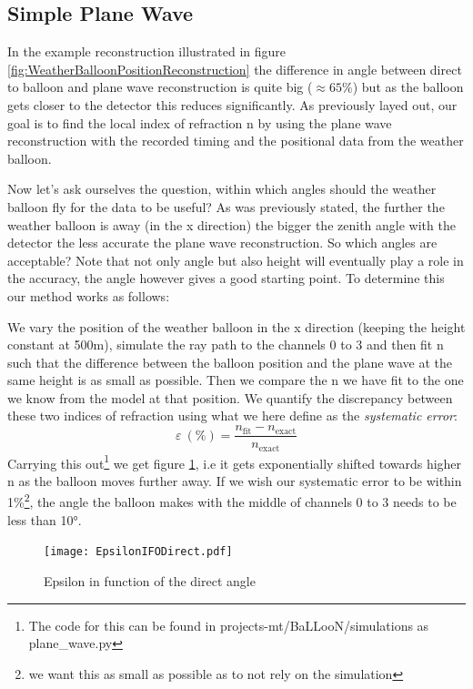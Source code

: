 \subsection{Simple Plane Wave}
In the example reconstruction illustrated in figure
\ref{fig:WeatherBalloonPositionReconstruction} the difference in angle between
direct to balloon and plane wave reconstruction is quite big
($\approx 65\%$) but as the balloon gets closer to the detector this reduces
significantly. As previously layed out, our goal is to find the local index of refraction n by using the
plane wave reconstruction with the recorded timing and the positional data from
the weather balloon.

Now let's ask ourselves the question, within which angles should the
weather balloon fly for the data to be useful?  As was previously stated, the
further the weather balloon is away (in the x direction) the bigger the zenith
angle with the detector the less accurate the plane wave reconstruction.  So
which angles are acceptable? Note that not only angle but also height will eventually
play a role in the accuracy, the angle however gives a good starting point.
To determine this our method works as follows: 

We vary the position of the weather balloon in the x direction (keeping the
height constant at 500m), simulate the ray path to the channels 0 to 3 and then fit n
such that the difference between the balloon position and the plane wave at the same
height is as small as possible.  Then we compare the n we have fit to the
one we know from the model at that position.  We quantify the discrepancy
between these two indices of refraction using what we here define as the
\textit{systematic error}:
\begin{equation}
  \varepsilon\ (\%) = \frac{n_\text{fit} - n_{\text{exact}}}{n_{\text{exact}}}
\end{equation}
Carrying this out\footnote{The code for this can be found in
projects-mt/BaLLooN/simulations as plane\_wave.py} we get figure
\ref{fig:EpsilonIFODirect}, i.e it gets exponentially shifted towards higher n
as the balloon moves further away. If we wish our systematic error to be
within 1\%\footnote{we want this as small as possible as to not rely on the
simulation}, the angle the balloon makes with the middle of channels 0 to 3
needs to be less than 10°.
\begin{figure}
	\centering
	\texttt{[image: EpsilonIFODirect.pdf]}
	\caption{Epsilon in function of the direct angle}
	\label{fig:EpsilonIFODirect}
\end{figure}

